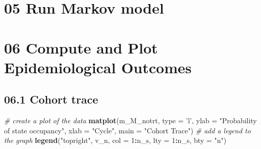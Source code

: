 \documentclass[
]{article}
\newenvironment{Shaded}{\begin{snugshade}}{\end{snugshade}}
\newcommand{\CommentTok}[1]{\textcolor[rgb]{0.56,0.35,0.01}{\textit{#1}}}
\newcommand{\ControlFlowTok}[1]{\textcolor[rgb]{0.13,0.29,0.53}{\textbf{#1}}}
\newcommand{\DataTypeTok}[1]{\textcolor[rgb]{0.13,0.29,0.53}{#1}}
\newcommand{\DecValTok}[1]{\textcolor[rgb]{0.00,0.00,0.81}{#1}}
\newcommand{\KeywordTok}[1]{\textcolor[rgb]{0.13,0.29,0.53}{\textbf{#1}}}
\newcommand{\NormalTok}[1]{#1}
\newcommand{\OperatorTok}[1]{\textcolor[rgb]{0.81,0.36,0.00}{\textbf{#1}}}
\newcommand{\StringTok}[1]{\textcolor[rgb]{0.31,0.60,0.02}{#1}}
\begin{document}
\hypertarget{run-markov-model}{%
\section{05 Run Markov model}\label{run-markov-model}}

\begin{Shaded}
\end{Shaded}

\hypertarget{compute-and-plot-epidemiological-outcomes}{%
\section{06 Compute and Plot Epidemiological
Outcomes}\label{compute-and-plot-epidemiological-outcomes}}

\hypertarget{cohort-trace-1}{%
\subsection{06.1 Cohort trace}\label{cohort-trace-1}}

\begin{Shaded}
\begin{Highlighting}[]
\CommentTok{# create a plot of the data}
\KeywordTok{matplot}\NormalTok{(m_M_notrt, }\DataTypeTok{type =} \StringTok{'l'}\NormalTok{, }
        \DataTypeTok{ylab =} \StringTok{"Probability of state occupancy"}\NormalTok{,}
        \DataTypeTok{xlab =} \StringTok{"Cycle"}\NormalTok{,}
        \DataTypeTok{main =} \StringTok{"Cohort Trace"}\NormalTok{)             }
\CommentTok{# add a legend to the graph}
\KeywordTok{legend}\NormalTok{(}\StringTok{"topright"}\NormalTok{, v_n, }\DataTypeTok{col =} \DecValTok{1}\OperatorTok{:}\NormalTok{n_s, }\DataTypeTok{lty =} \DecValTok{1}\OperatorTok{:}\NormalTok{n_s, }\DataTypeTok{bty =} \StringTok{"n"}\NormalTok{) }
\end{Highlighting}
\end{Shaded}
\end{document}
